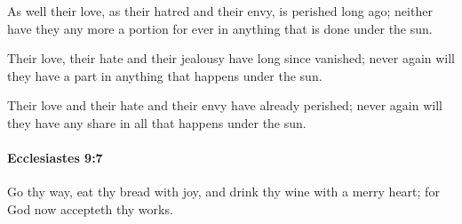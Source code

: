 			\begin{versebox}
					\item[BHS] 
					\item[LXX] 
					\item[ASV] As well their love, as their hatred and their envy, is perished long ago; neither have they any more a portion for ever in anything that is done under the sun.
					\item[NIV] Their love, their hate and their jealousy have long since vanished; never again will they have a part in anything that happens under the sun.
					\item[NRSV] Their love and their hate and their envy have already perished; never again will they have any share in all that happens under the sun.
			\end{versebox}

		\paragraph{Ecclesiastes 9:7} %
			\label{ECCLESIASTES-9-7}

			Go thy way, eat thy bread with joy, and drink thy wine with a merry heart; for God now accepteth thy works.

